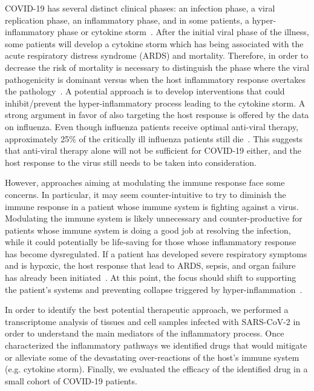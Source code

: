 COVID-19 has several distinct clinical phases:  an infection phase, a viral replication phase, an inflammatory phase, and in some patients, a hyper-inflammatory phase or cytokine storm~\cite{siddiqi2020covid,Ayres2020:survivingCOVID19}. After the initial viral phase of the illness, some patients will develop a cytokine storm which has being associated with the acute respiratory distress syndrome (ARDS) and mortality.  Therefore, in order to decrease the risk of mortality is necessary to distinguish the phase where the viral pathogenicity is dominant versus when the host inflammatory response overtakes the pathology~\cite{siddiqi2020covid,Ayres2020:survivingCOVID19}. A potential approach is to develop interventions that could inhibit/prevent the hyper-inflammatory process leading to the cytokine storm.
A strong argument in favor of also targeting the host response is offered by the data on influenza. Even though influenza patients receive optimal anti-viral therapy, approximately 25\% of the critically ill influenza patients still die~\cite{Ayres2020:survivingCOVID19,louie2012treatment}. This suggests that anti-viral therapy alone will not be sufficient for COVID-19 either, and the host response to the virus still needs to be taken into consideration.

However, approaches aiming at modulating the immune response face some concerns. In particular, it may seem counter-intuitive to try to diminish the immune response in a patient whose immune system is fighting against a virus. Modulating the immune system is likely unnecessary and counter-productive for patients whose immune system is doing a good job at resolving the infection, while it could potentially be life-saving for those whose inflammatory response has become dysregulated. If a patient has developed severe respiratory symptoms and is hypoxic, the host response that lead to ARDS, sepsis, and organ failure has already been initiated~\cite{mehta2020covid}. At this point, the focus should shift to supporting the patient's systems and preventing collapse triggered by hyper-inflammation~\cite{Ayres2020:survivingCOVID19}. 

In order to identify the best potential therapeutic approach, we performed a transcriptome analysis of tissues and cell samples infected with SARS-CoV-2 in order to understand the main mediators of the inflammatory process. Once characterized the inflammatory pathways we identified drugs that would mitigate or alleviate some of the devastating over-reactions of the host's immune system (e.g. cytokine storm). Finally, we evaluated the efficacy of the identified drug in a small cohort of COVID-19 patients.

